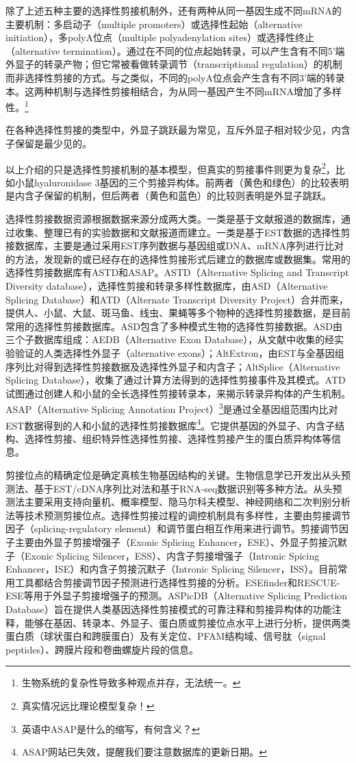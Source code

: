 \documentclass[11pt,a4paper,twoside]{book}
\begin{document}
除了上述五种主要的选择性剪接机制外，还有两种从同一基因生成不同mRNA的主要机制：多启动子（multiple promoters）或选择性起始（alternative initiation），多polyA位点（multiple polyadenylation sites）或选择性终止（alternative termination）。通过在不同的位点起始转录，可以产生含有不同5'端外显子的转录产物；但它常被看做转录调节（transcriptional regulation）的机制而非选择性剪接的方式。与之类似，不同的polyA位点会产生含有不同3'端的转录本。这两种机制与选择性剪接相结合，为从同一基因产生不同mRNA增加了多样性。\footnote{生物系统的复杂性导致多种观点并存，无法统一。}

在各种选择性剪接的类型中，外显子跳跃最为常见，互斥外显子相对较少见，内含子保留是最少见的。

以上介绍的只是选择性剪接机制的基本模型，但真实的剪接事件则更为复杂\footnote{真实情况远比理论模型复杂！}，比如小鼠hyaluronidase 3基因的三个剪接异构体。前两者（黄色和绿色）的比较表明是内含子保留的机制，但后两者（黄色和蓝色）的比较则表明是外显子跳跃。

选择性剪接数据资源根据数据来源分成两大类。一类是基于文献报道的数据库，通过收集、整理已有的实验数据和文献报道而建立。一类是基于EST数据的选择性剪接数据库，主要是通过采用EST序列数据与基因组或DNA、mRNA序列进行比对的方法，发现新的或已经存在的选择性剪接形式后建立的数据库或数据集。常用的选择性剪接数据库有ASTD和ASAP。ASTD（Alternative Splicing and Transcript Diversity database），选择性剪接和转录多样性数据库，由ASD（Alternative Splicing Database）和ATD（Alternate Transcript Diversity Project）合并而来，提供人、小鼠、大鼠、斑马鱼、线虫、果蝇等多个物种的选择性剪接数据，是目前常用的选择性剪接数据库。ASD包含了多种模式生物的选择性剪接数据。ASD由三个子数据库组成：AEDB（Alternative Exon Database），从文献中收集的经实验验证的人类选择性外显子（alternative exons）；AltExtron，由EST与全基因组序列比对得到选择性剪接数据及选择性外显子和内含子；AltSplice（Alternative Splicing Database），收集了通过计算方法得到的选择性剪接事件及其模式。ATD试图通过创建人和小鼠的全长选择性剪接转录本，来揭示转录异构体的产生机制。ASAP（Alternative Splicing Annotation Project）\footnote{英语中ASAP是什么的缩写，有何含义？}是通过全基因组范围内比对EST数据得到的人和小鼠的选择性剪接数据库\footnote{ASAP网站已失效，提醒我们要注意数据库的更新日期。}。它提供基因的外显子、内含子结构、选择性剪接、组织特异性选择性剪接、选择性剪接产生的蛋白质异构体等信息。

剪接位点的精确定位是确定真核生物基因结构的关键。生物信息学已开发出从头预测法、基于EST/cDNA序列比对法和基于RNA-seq数据识别等多种方法。从头预测法主要采用支持向量机、概率模型、隐马尔科夫模型、神经网络和二次判别分析法等技术预测剪接位点。选择性剪接过程的调控机制具有多样性，主要由剪接调节因子（splicing-regulatory element）和调节蛋白相互作用来进行调节。剪接调节因子主要由外显子剪接增强子（Exonic Splicing Enhancer，ESE）、外显子剪接沉默子（Exonic Splicing Silencer，ESS）、内含子剪接增强子（Intronic Spicing Enhancer，ISE）和内含子剪接沉默子（Intronic Splicing Silencer，ISS）。目前常用工具都结合剪接调节因子预测进行选择性剪接的分析。ESEfinder和RESCUE-ESE等用于外显子剪接增强子的预测。ASPicDB（Alternative Splicing Prediction Database）旨在提供人类基因选择性剪接模式的可靠注释和剪接异构体的功能注释，能够在基因、转录本、外显子、蛋白质或剪接位点水平上进行分析，提供两类蛋白质（球状蛋白和跨膜蛋白）及有关定位、PFAM结构域、信号肽（signal peptides）、跨膜片段和卷曲螺旋片段的信息。
\end{document}
